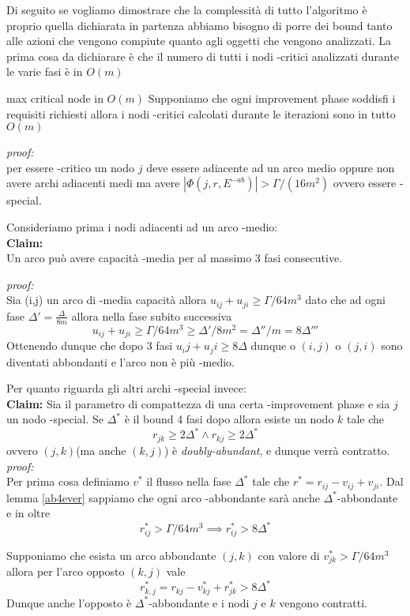 Di seguito se vogliamo dimostrare che la complessità di tutto l'algoritmo è proprio quella dichiarata in partenza abbiamo bisogno di porre dei bound tanto alle azioni che vengono compiute quanto agli oggetti che vengono analizzati.
La prima cosa da dichiarare è che il numero di tutti i nodi \gmm-critici analizzati durante le varie fasi è in $O(m)$
\begin{theorem}[label = maxM]{max critical node in $O(m)$}{}
    Supponiamo che ogni improvement phase soddisfi i requisiti richiesti allora  i nodi \gmm-critici calcolati durante le iterazioni sono in tutto $O(m)$
\end{theorem}
\textit{proof:}\\
    per essere \gmm-critico un nodo $j$ deve essere adiacente ad un arco \gmm medio oppure non avere archi adiacenti \gmm medi ma avere $|\Phi (j, r, E^{-ab})| > \Gamma/(16m^2)$ ovvero essere \gmm-special.

    Consideriamo prima i nodi adiacenti ad un arco \gmm-medio:\\
    \textbf{Claim:}\\
    Un arco può avere capacità \gmm-media per al massimo 3 fasi consecutive.

    \textit{proof:}\\
    Sia (i,j) un arco di \gmm-media capacità allora $u_{ij} + u_{ji} \ge \Gamma/64m^3$ dato che ad ogni fase $\Delta' = \frac{\Delta}{8m}$
    allora nella fase subito successiva  \[u_{ij} + u_{ji} \ge \Gamma/64m^3 \ge \Delta'/8m^2 =\Delta''/m = 8\Delta''' \]
    Ottenendo dunque che dopo 3 fasi $u_ij+u_ji \ge 8\Delta$ dunque o $(i,j)$ o $(j,i)$ sono diventati abbondanti e l'arco non è più \gmm-medio.

    Per quanto riguarda gli altri archi \gmm-special invece:\\
    \textbf{Claim:}
    Sia \gmm il parametro di compattezza di una certa \dlt-improvement phase e sia $j$ un nodo \gmm-special.
    Se $\Delta^*$ è il bound 4 fasi dopo \dlt allora esiste un nodo $k$ tale che 
    \[r_{jk}\ge 2\Delta^*\land r_{kj}\ge 2\Delta^* \] 
    ovvero $(j,k)$(ma anche $(k,j)$) è \textit{doubly-abundant}, e dunque verrà contratto.
    \textit{proof:}\\
    Per prima cosa definiamo $v^*$ il flusso nella fase $\Delta^*$ tale che $r^* = r_{ij}-v_{ij}+v_{ji}$.
    Dal lemma \ref{ab4ever} sappiamo che ogni arco \dlt-abbondante sarà anche $\Delta^*$-abbondante e in oltre
    \[r_{ij}^* > \Gamma/64m^3 \implies r_{ij}^*> 8\Delta^*\]

    Supponiamo che esista un arco abbondante $(j,k)$ con valore di $v_{jk}^*>\Gamma/64m^3$ allora per l'arco opposto $(k,j)$ vale
    \[r^*_{k,j}= r_{kj}-v^*_{kj}+r^*_{jk}> 8\Delta^*\]
    Dunque anche l'opposto è $\Delta^*$-abbondante e i nodi $j$ e $k$ vengono contratti.


